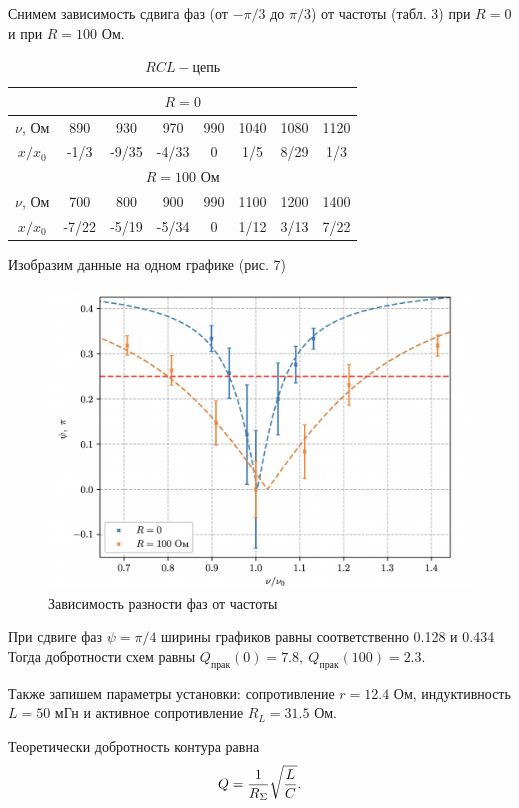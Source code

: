 \documentclass[12pt,a4paper]{article}
\begin{document}
Снимем зависимость сдвига фаз (от $-\pi/3$ до  $\pi/3$) от частоты (табл. 3) при $R = 0$ и при $R=100$ Ом.
\begin{table}[H]
    \centering
    \begin{tabular}{|c|c|c|c|c|c|c|c|}
        \hline
        \multicolumn{8}{|c|}{$R = 0$} \\
        \hline
        $\nu$, Ом &890&930&970&990&1040&1080&1120\\
        \hline
        $x/x_0$ &-1/3&-9/35&-4/33&0&1/5&8/29&1/3\\
        \hline
        \multicolumn{8}{|c|}{$R = 100$ Ом} \\
        \hline
        $\nu$, Ом &700&800&900&990&1100&1200&1400\\
        \hline
        $x/x_0$ &-7/22&-5/19&-5/34&0&1/12&3/13&7/22\\
        \hline
    \end{tabular}
    \caption{$RCL - $цепь}
\end{table}

Изобразим данные на одном графике (рис. 7)

\begin{figure}[H]
    \centering
    \includegraphics[width=0.7\linewidth]{3.png}
    \caption{Зависимость разности фаз от частоты}
\end{figure}

При сдвиге фаз $\psi = \pi/4$ ширины графиков равны соответственно %
0.128 и 0.434
Тогда добротности схем равны $Q_{прак}(0) = 7.8,\ Q_{прак}(100) = 2.3$.

Также запишем параметры установки:
сопротивление $r = 12.4$ Ом, индуктивность $L = 50$ мГн и активное сопротивление $R_L = 31.5$ Ом.


Теоретически добротность контура равна 
\begin{equation*}
    Q = {1 \over R_\Sigma} \sqrt{L \over C}.
\end{equation*}
\end{document}
